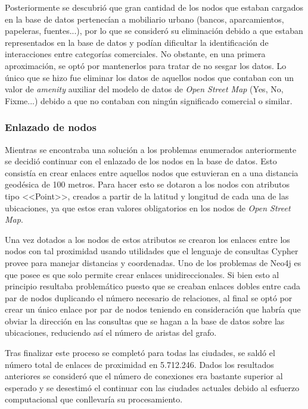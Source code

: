 Posteriormente se descubrió que gran cantidad de los nodos que estaban cargados en la base de datos pertenecían a mobiliario urbano (bancos, aparcamientos, papeleras, fuentes...), por lo que se consideró su eliminación debido a que estaban representados en la base de datos y podían dificultar la identificación de interacciones entre categorías comerciales. No obstante, en una primera aproximación, se optó por mantenerlos para tratar de no sesgar los datos. Lo único que se hizo fue eliminar los datos de aquellos nodos que contaban con un valor de \textit{amenity} auxiliar del modelo de datos de \textit{Open Street Map} (Yes, No, Fixme...) debido a que no contaban con ningún significado comercial o similar.


\subsubsection{Enlazado de nodos}

Mientras se encontraba una solución a los problemas enumerados anteriormente se decidió continuar con el enlazado de los nodos en la base de datos. Esto consistía en crear enlaces entre aquellos nodos que estuvieran en a una distancia geodésica de 100 metros. Para hacer esto se dotaron a los nodos con atributos tipo <<Point>>, creados a partir de la latitud y longitud de cada una de las ubicaciones, ya que estos eran valores obligatorios en los nodos de \textit{Open Street Map}.


 Una vez dotados a los nodos de estos atributos se crearon los enlaces entre los nodos con tal proximidad usando utilidades que el lenguaje de consultas Cypher provee para manejar distancias y coordenadas. Uno de los problemas de Neo4j es que posee es que solo permite crear enlaces unidireccionales. Si bien esto al principio resultaba problemático puesto que se creaban enlaces dobles entre cada par de nodos duplicando el número necesario de relaciones, al final se optó por crear un único enlace por par de nodos teniendo en consideración que habría que obviar la dirección en las consultas que se hagan a la base de datos sobre las ubicaciones, reduciendo así el número de aristas del grafo.
 
  Tras finalizar este proceso se completó para todas las ciudades, se saldó el número total de enlaces de proximidad en 5.712.246. Dados los resultados anteriores se consideró que el número de conexiones era bastante superior al esperado y se desestimó el continuar con las ciudades actuales debido al esfuerzo computacional que conllevaría su procesamiento.


